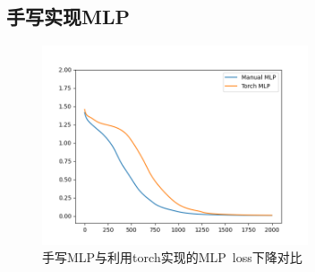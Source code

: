 \documentclass[UTF8]{article}
\begin{document}
    \subsection{手写实现MLP}
    \begin{figure}[H]
        \centering
        \includegraphics[width=0.7\textwidth]{./figs/mlp.png}
        \caption{手写MLP与利用torch实现的MLP\ loss下降对比}
    \end{figure}
\end{document}
